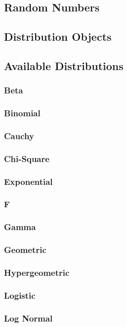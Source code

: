 \documentclass[12pt,a4paper]{article}
\begin{document}
\subsection{Random Numbers}
\subsection{Distribution Objects}
\subsection{Available Distributions}
\subsubsection{Beta}
\subsubsection{Binomial}
\subsubsection{Cauchy}
\subsubsection{Chi-Square}
\subsubsection{Exponential}
\subsubsection{F}
\subsubsection{Gamma}
\subsubsection{Geometric}
\subsubsection{Hypergeometric}
\subsubsection{Logistic}
\subsubsection{Log Normal}
\end{document}
